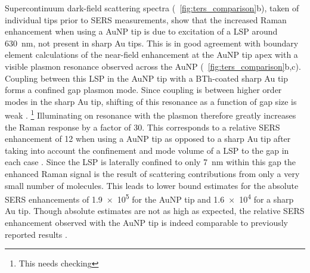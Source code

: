 \documentclass{article}
\begin{document}
Supercontinuum dark-field scattering spectra (\figurename~\ref{fig:ters_comparison}b), taken of individual tips prior to SERS measurements, show that the increased Raman enhancement when using a AuNP tip is due to excitation of a LSP around \SI{630}{nm}, not present in sharp Au tips. This is in good agreement with boundary element calculations of the near-field enhancement at the AuNP tip apex with a visible plasmon resonance observed across the AuNP (\figurename~\ref{fig:ters_comparison}b,c).
Coupling between this LSP in the AuNP tip with a BTh-coated sharp Au tip forms a confined gap plasmon mode. Since coupling is between higher order modes in the sharp Au tip, shifting of this resonance as a function of gap size is weak \cite{hugall2012}.%
\footnote{This needs checking}
Illuminating on resonance with the plasmon therefore greatly increases the Raman response by a factor of 30. This corresponds to a relative SERS enhancement of 12 when using a AuNP tip as opposed to a sharp Au tip after taking into account the confinement and mode volume of a LSP to the gap in each case \cite{romero2006}. Since the LSP is laterally confined to only \SI{7}{nm} within this gap the enhanced Raman signal is the result of scattering contributions from only a very small number of molecules. This leads to lower bound estimates for the absolute SERS enhancements of \num{1.9e5} for the AuNP tip and \num{1.6e4} for a sharp Au tip. Though absolute estimates are not as high as expected, the relative SERS enhancement observed with the AuNP tip is indeed comparable to previously reported results \cite{umakoshi2012}.
\end{document}
